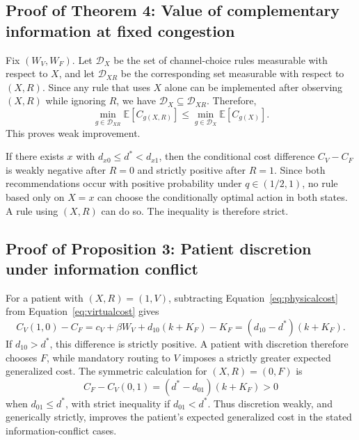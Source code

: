 \documentclass[11pt]{article}
\newcommand{\E}{\mathbb{E}}
\begin{document}
\subsection{Proof of Theorem 4: Value of complementary information at fixed congestion}

Fix $(W_V,W_F)$.  Let $\mathcal{D}_X$ be the set of channel-choice rules measurable with respect to $X$, and let $\mathcal{D}_{XR}$ be the corresponding set measurable with respect to $(X,R)$.  Since any rule that uses $X$ alone can be implemented after observing $(X,R)$ while ignoring $R$, we have $\mathcal{D}_X\subseteq\mathcal{D}_{XR}$.  Therefore,
\[
 \min_{g\in\mathcal{D}_{XR}}\E[C_{g(X,R)}]
 \leq
 \min_{g\in\mathcal{D}_X}\E[C_{g(X)}].
\]
This proves weak improvement.

If there exists $x$ with $d_{x0}\leq d^*<d_{x1}$, then the conditional cost difference $C_V-C_F$ is weakly negative after $R=0$ and strictly positive after $R=1$.  Since both recommendations occur with positive probability under $q\in(1/2,1)$, no rule based only on $X=x$ can choose the conditionally optimal action in both states.  A rule using $(X,R)$ can do so.  The inequality is therefore strict.

\subsection{Proof of Proposition 3: Patient discretion under information conflict}

For a patient with $(X,R)=(1,V)$, subtracting Equation~\eqref{eq:physicalcost} from Equation~\eqref{eq:virtualcost} gives
\[
 C_V(1,0)-C_F
 =c_V+\beta W_V+d_{10}(k+K_F)-K_F
 =(d_{10}-d^*)(k+K_F).
\]
If $d_{10}>d^*$, this difference is strictly positive.  A patient with discretion therefore chooses $F$, while mandatory routing to $V$ imposes a strictly greater expected generalized cost.  The symmetric calculation for $(X,R)=(0,F)$ is
\[
 C_F-C_V(0,1)=(d^*-d_{01})(k+K_F)>0
\]
when $d_{01}\leq d^*$, with strict inequality if $d_{01}<d^*$.  Thus discretion weakly, and generically strictly, improves the patient's expected generalized cost in the stated information-conflict cases.
\end{document}
